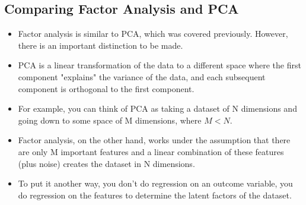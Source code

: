 \documentclass[SKL-MASTER.tex]{subfiles}
\begin{document}
\subsection{Comparing Factor Analysis and PCA}
\begin{itemize}
\item Factor analysis is similar to PCA, which was covered previously. However, there is an important
distinction to be made. 
\item PCA is a linear transformation of the data to a different space where
the first component "explains" the variance of the data, and each subsequent component is
orthogonal to the first component.
\item For example, you can think of PCA as taking a dataset of N dimensions and going down to
some space of M dimensions, where $M < N$.

\item Factor analysis, on the other hand, works under the assumption that there are only M
important features and a linear combination of these features (plus noise) creates the
dataset in N dimensions.
\item  To put it another way, you don't do regression on an outcome
variable, you do regression on the features to determine the latent factors of the dataset.
\end{itemize}
\end{document}
